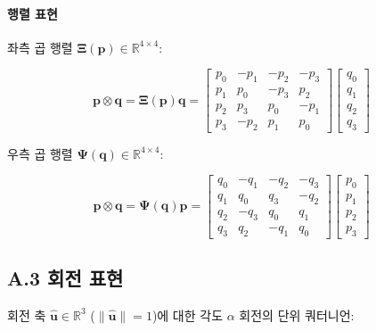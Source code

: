 \paragraph{행렬 표현}
 
좌측 곱 행렬 $\boldsymbol{\Xi}(\mathbf{p}) \in \mathbb{R}^{4\times 4}$:
 
\begin{equation}
    \mathbf{p} \otimes \mathbf{q} = \boldsymbol{\Xi}(\mathbf{p})\mathbf{q} =
    \begin{bmatrix}
        p_0 & -p_1 & -p_2 & -p_3 \\
        p_1 &  p_0 & -p_3 &  p_2 \\
        p_2 &  p_3 &  p_0 & -p_1 \\
        p_3 & -p_2 &  p_1 &  p_0
    \end{bmatrix}
    \begin{bmatrix} q_0 \\ q_1 \\ q_2 \\ q_3 \end{bmatrix}
    \tag{A.7}
\end{equation}
 
우측 곱 행렬 $\boldsymbol{\Psi}(\mathbf{q}) \in \mathbb{R}^{4\times 4}$:
 
\begin{equation}
    \mathbf{p} \otimes \mathbf{q} = \boldsymbol{\Psi}(\mathbf{q})\mathbf{p} =
    \begin{bmatrix}
        q_0 & -q_1 & -q_2 & -q_3 \\
        q_1 &  q_0 &  q_3 & -q_2 \\
        q_2 & -q_3 &  q_0 &  q_1 \\
        q_3 &  q_2 & -q_1 &  q_0
    \end{bmatrix}
    \begin{bmatrix} p_0 \\ p_1 \\ p_2 \\ p_3 \end{bmatrix}
    \tag{A.8}
\end{equation}
 
\subsection*{A.3 회전 표현}
 
회전 축 $\hat{\mathbf{u}} \in \mathbb{R}^3$ ($\|\hat{\mathbf{u}}\| = 1$)에 대한
각도 $\alpha$ 회전의 단위 쿼터니언:
 
